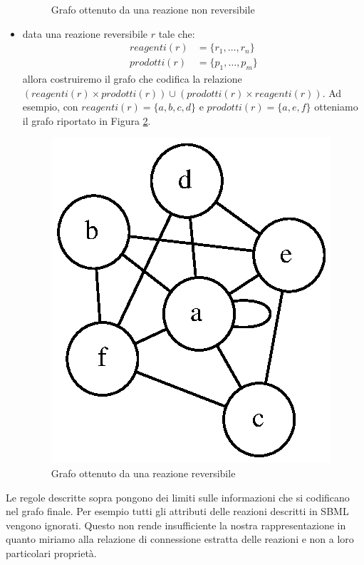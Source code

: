 \begin{itemize}
\begin{figure}
    \caption{Grafo ottenuto da una reazione non reversibile}
    \label{fig:non-reversible-reaction-mapping}
  \end{figure}
\item data una reazione reversibile $r$ tale che:
  \begin{displaymath}
    \begin{split} 
      reagenti(r) &= \{ r_{1}, \ldots, r_{n} \} \\
      prodotti(r) &= \{ p_{1}, \ldots, p_{m} \}
    \end{split}
  \end{displaymath}
  allora costruiremo il grafo che codifica la relazione $(reagenti(r)
  \times prodotti(r)) \cup (prodotti(r) \times reagenti(r))$. Ad
  esempio, con $reagenti(r) = \{ a, b, c, d \}$ e $prodotti(r) = \{a,
  e, f\}$ otteniamo il grafo riportato in Figura
  \ref{fig:reversible-reaction-mapping}.
  \begin{figure}
    \centering
    \includegraphics{images/reversible-reaction-example.dot.eps}
    \caption{Grafo ottenuto da una reazione reversibile}
    \label{fig:reversible-reaction-mapping}
  \end{figure}
\end{itemize}
Le regole descritte sopra pongono dei limiti sulle informazioni che si
codificano nel grafo finale. Per esempio tutti gli attributi delle
reazioni descritti in SBML vengono ignorati. Questo non rende
insufficiente la nostra rappresentazione in quanto miriamo alla
relazione di connessione estratta delle reazioni e non a loro
particolari propriet\`a.

